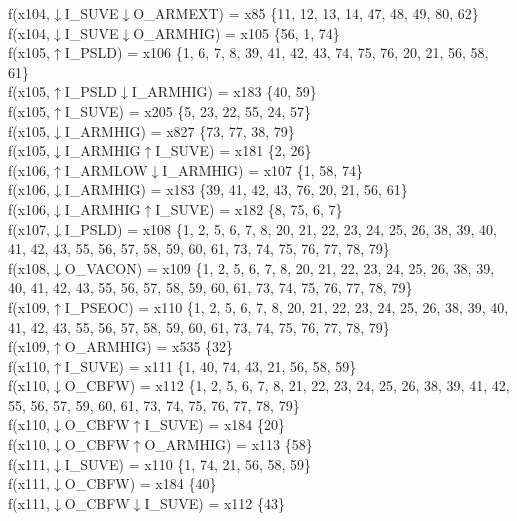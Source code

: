 f(x104,$\downarrow$I\_SUVE$\downarrow$O\_ARMEXT) = x85 \{11, 12, 13, 14, 47, 48, 49, 80, 62\} \\  
f(x104,$\downarrow$I\_SUVE$\downarrow$O\_ARMHIG) = x105 \{56, 1, 74\} \\  
f(x105,$\uparrow$I\_PSLD) = x106 \{1, 6, 7, 8, 39, 41, 42, 43, 74, 75, 76, 20, 21, 56, 58, 61\} \\  
f(x105,$\uparrow$I\_PSLD$\downarrow$I\_ARMHIG) = x183 \{40, 59\} \\  
f(x105,$\uparrow$I\_SUVE) = x205 \{5, 23, 22, 55, 24, 57\} \\  
f(x105,$\downarrow$I\_ARMHIG) = x827 \{73, 77, 38, 79\} \\  
f(x105,$\downarrow$I\_ARMHIG$\uparrow$I\_SUVE) = x181 \{2, 26\} \\  
f(x106,$\uparrow$I\_ARMLOW$\downarrow$I\_ARMHIG) = x107 \{1, 58, 74\} \\  
f(x106,$\downarrow$I\_ARMHIG) = x183 \{39, 41, 42, 43, 76, 20, 21, 56, 61\} \\  
f(x106,$\downarrow$I\_ARMHIG$\uparrow$I\_SUVE) = x182 \{8, 75, 6, 7\} \\  
f(x107,$\downarrow$I\_PSLD) = x108 \{1, 2, 5, 6, 7, 8, 20, 21, 22, 23, 24, 25, 26, 38, 39, 40, 41, 42, 43, 55, 56, 57, 58, 59, 60, 61, 73, 74, 75, 76, 77, 78, 79\} \\  
f(x108,$\downarrow$O\_VACON) = x109 \{1, 2, 5, 6, 7, 8, 20, 21, 22, 23, 24, 25, 26, 38, 39, 40, 41, 42, 43, 55, 56, 57, 58, 59, 60, 61, 73, 74, 75, 76, 77, 78, 79\} \\  
f(x109,$\uparrow$I\_PSEOC) = x110 \{1, 2, 5, 6, 7, 8, 20, 21, 22, 23, 24, 25, 26, 38, 39, 40, 41, 42, 43, 55, 56, 57, 58, 59, 60, 61, 73, 74, 75, 76, 77, 78, 79\} \\  
f(x109,$\uparrow$O\_ARMHIG) = x535 \{32\} \\  
f(x110,$\uparrow$I\_SUVE) = x111 \{1, 40, 74, 43, 21, 56, 58, 59\} \\  
f(x110,$\downarrow$O\_CBFW) = x112 \{1, 2, 5, 6, 7, 8, 21, 22, 23, 24, 25, 26, 38, 39, 41, 42, 55, 56, 57, 59, 60, 61, 73, 74, 75, 76, 77, 78, 79\} \\  
f(x110,$\downarrow$O\_CBFW$\uparrow$I\_SUVE) = x184 \{20\} \\  
f(x110,$\downarrow$O\_CBFW$\uparrow$O\_ARMHIG) = x113 \{58\} \\  
f(x111,$\downarrow$I\_SUVE) = x110 \{1, 74, 21, 56, 58, 59\} \\  
f(x111,$\downarrow$O\_CBFW) = x184 \{40\} \\  
f(x111,$\downarrow$O\_CBFW$\downarrow$I\_SUVE) = x112 \{43\} \\  
